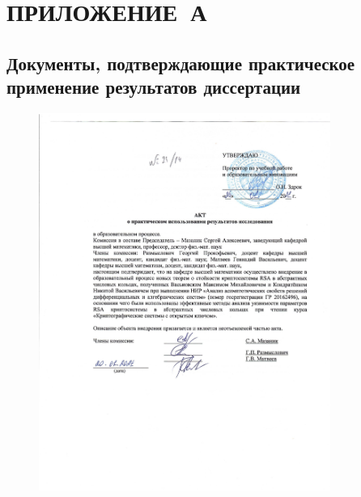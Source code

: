 \documentclass[_00_dissertation.tex]{subfiles}
\begin{document}
\onlyinsubfile{
    \renewcommand{\contentsname}{ОГЛАВЛЕНИЕ}
    \setcounter{tocdepth}{3}
    \tableofcontents
}

\chapter*{\hfill ПРИЛОЖЕНИЕ~А}
\section*{Документы, подтверждающие практическое применение результатов диссертации}\label{section:Appendix_counterexample}

\begin{figure}[ht!]
    \centering
    \includegraphics[width=0.85\textwidth]{../additional/Act_KondratyonokNV_page-0001.jpg}
\end{figure}
\end{document}
